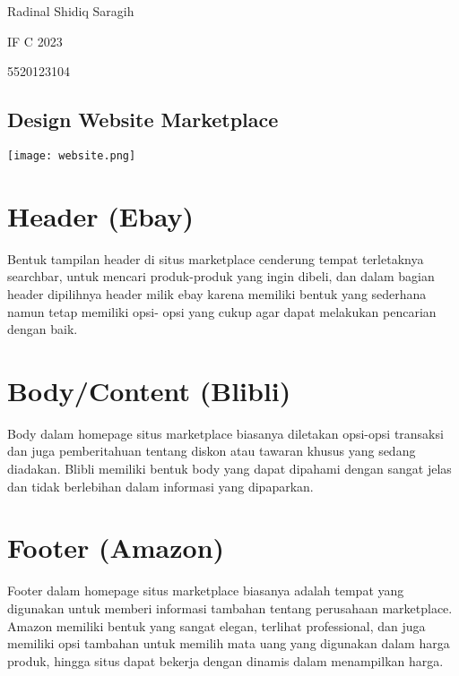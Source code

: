 \documentclass[11pt,a4paper]{article}
\date{}
\begin{document}
\begin{flushleft}

  Radinal Shidiq Saragih

  IF C 2023

  5520123104

\end{flushleft}


\begin{center}
  \section*{Design Website Marketplace}
  {\texttt{[image: website.png]}}
\end{center}

\section*{Header (Ebay)}

Bentuk tampilan header di situs marketplace cenderung tempat terletaknya searchbar,
untuk mencari produk-produk yang ingin dibeli, dan dalam bagian header dipilihnya
header milik ebay karena memiliki bentuk yang sederhana namun tetap memiliki opsi-
opsi yang cukup agar dapat melakukan pencarian dengan baik. 

\section*{Body/Content (Blibli)}

Body dalam homepage situs marketplace biasanya diletakan opsi-opsi transaksi dan
juga pemberitahuan tentang diskon atau tawaran khusus yang sedang diadakan. Blibli
memiliki bentuk body yang dapat dipahami dengan sangat jelas dan tidak berlebihan
dalam informasi yang dipaparkan.

\section*{Footer (Amazon)}

Footer dalam homepage situs marketplace biasanya adalah tempat yang digunakan
untuk memberi informasi tambahan tentang perusahaan marketplace. Amazon memiliki
bentuk yang sangat elegan, terlihat professional, dan juga memiliki opsi tambahan
untuk memilih mata uang yang digunakan dalam harga produk, hingga situs dapat
bekerja dengan dinamis dalam menampilkan harga.
  
\end{document}
